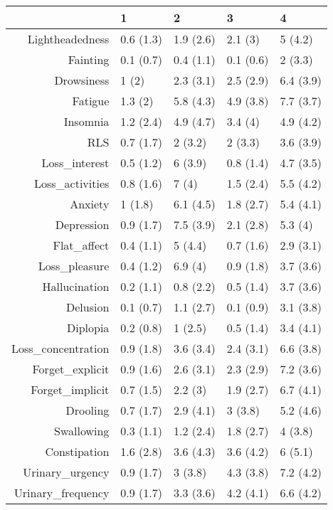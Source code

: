 \begin{table}[ht]
\centering
\begin{tabular}{rllll}
  \toprule
 & 1 & 2 & 3 & 4 \\ 
  \midrule
Lightheadedness & 0.6 (1.3) & 1.9 (2.6) & 2.1 (3) & 5 (4.2) \\ 
  Fainting & 0.1 (0.7) & 0.4 (1.1) & 0.1 (0.6) & 2 (3.3) \\ 
  Drowsiness & 1 (2) & 2.3 (3.1) & 2.5 (2.9) & 6.4 (3.9) \\ 
  Fatigue & 1.3 (2) & 5.8 (4.3) & 4.9 (3.8) & 7.7 (3.7) \\ 
  Insomnia & 1.2 (2.4) & 4.9 (4.7) & 3.4 (4) & 4.9 (4.2) \\ 
  RLS & 0.7 (1.7) & 2 (3.2) & 2 (3.3) & 3.6 (3.9) \\ 
  Loss\_interest & 0.5 (1.2) & 6 (3.9) & 0.8 (1.4) & 4.7 (3.5) \\ 
  Loss\_activities & 0.8 (1.6) & 7 (4) & 1.5 (2.4) & 5.5 (4.2) \\ 
  Anxiety & 1 (1.8) & 6.1 (4.5) & 1.8 (2.7) & 5.4 (4.1) \\ 
  Depression & 0.9 (1.7) & 7.5 (3.9) & 2.1 (2.8) & 5.3 (4) \\ 
  Flat\_affect & 0.4 (1.1) & 5 (4.4) & 0.7 (1.6) & 2.9 (3.1) \\ 
  Loss\_pleasure & 0.4 (1.2) & 6.9 (4) & 0.9 (1.8) & 3.7 (3.6) \\ 
  Hallucination & 0.2 (1.1) & 0.8 (2.2) & 0.5 (1.4) & 3.7 (3.6) \\ 
  Delusion & 0.1 (0.7) & 1.1 (2.7) & 0.1 (0.9) & 3.1 (3.8) \\ 
  Diplopia & 0.2 (0.8) & 1 (2.5) & 0.5 (1.4) & 3.4 (4.1) \\ 
  Loss\_concentration & 0.9 (1.8) & 3.6 (3.4) & 2.4 (3.1) & 6.6 (3.8) \\ 
  Forget\_explicit & 0.9 (1.6) & 2.6 (3.1) & 2.3 (2.9) & 7.2 (3.6) \\ 
  Forget\_implicit & 0.7 (1.5) & 2.2 (3) & 1.9 (2.7) & 6.7 (4.1) \\ 
  Drooling & 0.7 (1.7) & 2.9 (4.1) & 3 (3.8) & 5.2 (4.6) \\ 
  Swallowing & 0.3 (1.1) & 1.2 (2.4) & 1.8 (2.7) & 4 (3.8) \\ 
  Constipation & 1.6 (2.8) & 3.6 (4.3) & 3.6 (4.2) & 6 (5.1) \\ 
  Urinary\_urgency & 0.9 (1.7) & 3 (3.8) & 4.3 (3.8) & 7.2 (4.2) \\ 
  Urinary\_frequency & 0.9 (1.7) & 3.3 (3.6) & 4.2 (4.1) & 6.6 (4.2) \\ 

\end{tabular}
\end{table}
